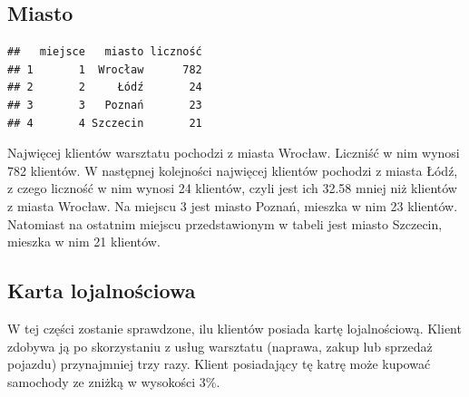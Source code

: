 \documentclass{article}\usepackage[]{graphicx}\usepackage[]{xcolor}
\makeatletter
\newenvironment{kframe}{%
 \def\at@end@of@kframe{}%
 \ifinner\ifhmode%
  \def\at@end@of@kframe{\end{minipage}}%
  \begin{minipage}{\columnwidth}%
 \fi\fi%
 \def\FrameCommand##1{\hskip\@totalleftmargin \hskip-\fboxsep
 \colorbox{shadecolor}{##1}\hskip-\fboxsep
     \hskip-\linewidth \hskip-\@totalleftmargin \hskip\columnwidth}%
 \MakeFramed {\advance\hsize-\width
   \@totalleftmargin\z@ \linewidth\hsize
   \@setminipage}}%
 {\par\unskip\endMakeFramed%
 \at@end@of@kframe}
\newenvironment{knitrout}{}{} %
\makeatother
\begin{document}
\subsection{Miasto}
\begin{knitrout}
\color{fgcolor}\begin{kframe}
\begin{verbatim}
##   miejsce   miasto liczność
## 1       1  Wrocław      782
## 2       2     Łódź       24
## 3       3   Poznań       23
## 4       4 Szczecin       21
\end{verbatim}
\end{kframe}
\end{knitrout}

Najwięcej klientów warsztatu pochodzi z miasta Wrocław. Liczniść w nim wynosi 782 klientów. W następnej kolejności najwięcej klientów pochodzi z miasta Łódź, z czego liczność w nim wynosi 24 klientów, czyli jest ich 32.58 mniej niż klientów z miasta Wrocław. Na miejscu 3 jest miasto Poznań, mieszka w nim 23 klientów. Natomiast na ostatnim miejscu przedstawionym w tabeli jest miasto Szczecin, mieszka w nim 21 klientów.

\subsection{Karta lojalnościowa}

W tej części zostanie sprawdzone, ilu klientów posiada kartę lojalnościową. Klient zdobywa ją po skorzystaniu z usług warsztatu (naprawa, zakup lub sprzedaż pojazdu) przynajmniej trzy razy. Klient posiadający tę katrę może kupować samochody ze zniżką w wysokości 3\%.
\end{document}
